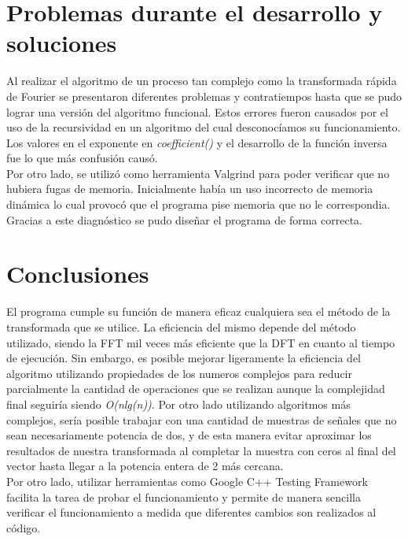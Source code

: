 \documentclass[12pt,a4paper]{report}
\begin{document}
	\section{Problemas durante el desarrollo y soluciones}
		
        \indent Al realizar el algoritmo de un proceso tan complejo como la transformada rápida de Fourier se presentaron diferentes
        problemas y contratiempos hasta que se pudo lograr una versión del algoritmo funcional. Estos errores fueron causados por el
        uso de la recursividad en un algoritmo del cual desconocíamos su funcionamiento. Los valores en el exponente en \textit{coefficient()} 
        y el desarrollo de la función inversa fue lo que más confusión causó.
        \\
        \indent Por otro lado, se utilizó como herramienta Valgrind para poder verificar que no hubiera fugas de memoria. Inicialmente había 
        un uso incorrecto de memoria dinámica lo cual provocó que el programa pise memoria que no le correspondia. Gracias a este diagnóstico 
        se pudo diseñar el programa de forma correcta.

   

	\section{Conclusiones}
	
		\indent	El programa cumple su función de manera eficaz cualquiera sea el método de la transformada que se utilice. La eficiencia
		del mismo depende del método utilizado, siendo la FFT mil veces más eficiente que la DFT en cuanto al tiempo de ejecución. Sin
		embargo, es posible mejorar ligeramente	la eficiencia del algoritmo utilizando propiedades de los numeros complejos para reducir
		parcialmente la cantidad de operaciones que se	realizan aunque la complejidad final seguiría siendo \textit{O(nlg(n))}. Por otro 
		lado utilizando algoritmos más complejos, sería posible	trabajar con una cantidad de muestras de señales que no sean
		necesariamente potencia de dos, y de esta manera evitar aproximar los resultados de nuestra transformada al completar la muestra 
		con ceros al final del vector hasta llegar a la potencia entera de 2 más cercana.
		\\
		\indent Por otro lado, utilizar herramientas como Google C++ Testing Framework facilita la tarea de probar el funcionamiento y permite
		de manera sencilla verificar el	funcionamiento a medida que diferentes cambios son realizados al código.
\end{document}
